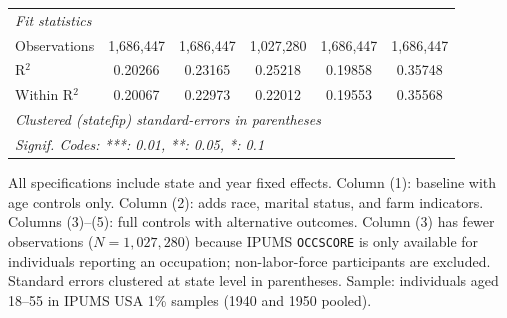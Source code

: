 \begin{table}[htbp]
\begin{tabular}{lccccc}
      \midrule
      \emph{Fit statistics}\\
      Observations                         & 1,686,447       & 1,686,447       & 1,027,280      & 1,686,447       & 1,686,447\\  
      R$^2$                                & 0.20266         & 0.23165         & 0.25218        & 0.19858         & 0.35748\\  
      Within R$^2$                         & 0.20067         & 0.22973         & 0.22012        & 0.19553         & 0.35568\\  
      \midrule \midrule
      \multicolumn{6}{l}{\emph{Clustered (statefip) standard-errors in parentheses}}\\
      \multicolumn{6}{l}{\emph{Signif. Codes: ***: 0.01, **: 0.05, *: 0.1}}\\
   \end{tabular}
   
   \par \raggedright 
   All specifications include state and year fixed effects. Column (1): baseline with age controls only. Column (2): adds race, marital status, and farm indicators. Columns (3)--(5): full controls with alternative outcomes. Column (3) has fewer observations ($N = 1{,}027{,}280$) because IPUMS \texttt{OCCSCORE} is only available for individuals reporting an occupation; non-labor-force participants are excluded. Standard errors clustered at state level in parentheses. Sample: individuals aged 18--55 in IPUMS USA 1\% samples (1940 and 1950 pooled).
\end{table}


